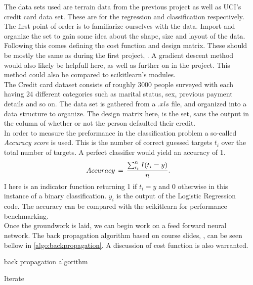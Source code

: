 \documentclass[12pt, a4paper]{scrartcl}
\begin{document}
    The data sets used are terrain data from the previous project as well as UCI's credit card 
data set. These are for the regression and classification respectively.  \\

    The first point of order is to familiarize ourselves with the data. Import and organize the 
set to gain some idea about the shape, size and layout of the data. Following this comes defining 
the cost function and design matrix.  These should be mostly the same as during the first 
project, \cite{project1}. A gradient descent method would also likely be helpfull here, as well 
as further on in the project. This method could also be compared to scikitlearn's modules. \\

    The Credit card dataset consists of roughly $3 000$ people surveyed with each having $24$ 
different categories such as marital status, sex, previous payment details and so on. The data set
is gathered from a $.xls$ file, and organized into a \cite{pandas} data structure to organize. 
The design matrix here, is the set, sans the output in the column of whether or not the person defaulted
their credit. \\

    In order to measure the preformance in the classification problem a so-called 
\textit{Accuracy score} is used. This is the number of correct guessed targets $t_i$ over the 
total number of targets. A perfect classifier would yield an accuracy of 1.  
\begin{align} 
    Accuracy \,=\, \frac{ \sum_{i_1}^n I\qty( t_i = y ) }{ n }.
\label{eq:accuracy}
\end{align}
I here is an indicator function returning 1 if $t_i = y$ and 0 otherwise in this instance of a 
binary classification. $y_i$ is the output of the Logistic Regression code. The accuracy can be 
compared with the scikitlearn for performance benchmarking. \\ 

    Once the groundwork is laid, we can begin work on a feed forward neural network. The back 
propagation algorithm based on course slides, \cite{slides}, can be seen bellow in 
\ref{algo:backpropagation}. A discussion of cost function is also warranted. \\ 
\begin{algorithm}
\caption{back propagation algorithm}
\begin{algorithmic}
\STATE Iterate
\ENDFOR
\end{algorithmic}
\label{algo:backpropagation}
\end{algorithm}
\end{document}
